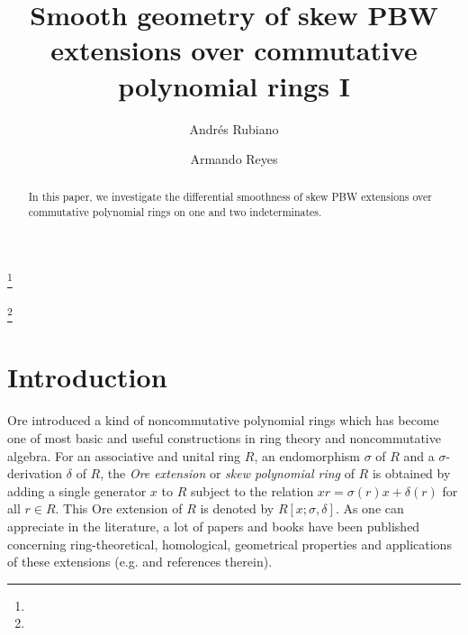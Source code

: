 \documentclass{amsart}
\theoremstyle{definition}
\theoremstyle{remark}
\numberwithin{equation}{section}
\begin{document}
\title[Smooth geometry of skew PBW extensions I]{Smooth geometry of skew PBW extensions over commutative polynomial rings I}


\author{Andr\'es Rubiano}
\address{Universidad Nacional de Colombia - Sede Bogot\'a}
\address{Universidad ECCI}
\thanks{}


\author{Armando Reyes}
\address{Universidad Nacional de Colombia - Sede Bogot\'a}

\thanks{}



\date{}


\begin{abstract} 

In this paper, we investigate the differential smoothness of skew PBW extensions over commutative polynomial rings on one and two indeterminates.

\end{abstract}

\maketitle


\section{Introduction}

Ore \cite{Ore1931, Ore1933} introduced a kind of noncommutative polynomial rings which has become one of most basic and useful constructions in ring theory and noncommutative algebra. For an associative and unital ring $R$, an endomorphism $\sigma$ of $R$ and a $\sigma$-derivation $\delta$ of $R$, the {\em Ore extension} or {\em skew polynomial ring} of $R$ is obtained by adding a single generator $x$ to $R$ subject to the relation $xr = \sigma(r) x + \delta(r)$ for all $r\in R$. This Ore extension of $R$ is denoted by $R[x; \sigma, \delta]$. As one can appreciate in the literature, a lot of papers and books have been published concerning ring-theoretical, homological, geometrical properties and applications of these extensions (e.g. \cite{BrownGoodearl2002, BuesoTorrecillasVerschoren2003, Fajardoetal2020, Fajardoetal2024, GoodearlLetzter1994, GoodearlWarfield2004, McConnellRobson2001, Li2002, Rosenberg1995, SeilerBook2010} and references therein). 
\end{document}
